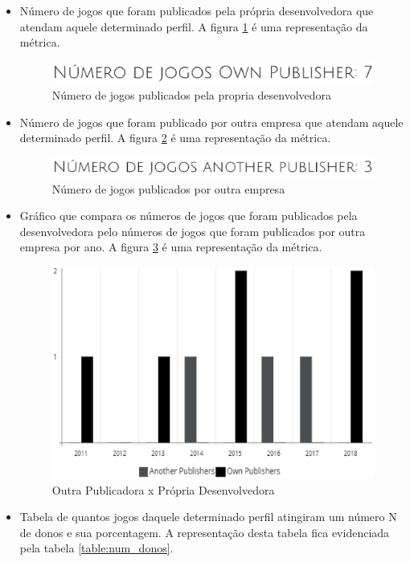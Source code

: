 \begin{itemize}
	\item Número de jogos que foram publicados pela própria desenvolvedora que atendam aquele determinado perfil. A figura \ref{image:own} é uma representação da métrica.
	\begin{figure}
	\centering
	\includegraphics[scale=0.5]{figuras/own_publisher.eps}
	\caption{Número de jogos publicados pela propria desenvolvedora}
	\label{image:own}
	\end{figure}
	\item Número de jogos que foram publicado por outra empresa que atendam aquele determinado perfil. A figura \ref{image:another} é uma representação da métrica.
	\begin{figure}
	\centering
	\includegraphics[scale=0.5]{figuras/another_publisher.eps}
	\caption{Número de jogos publicados por outra empresa}
	\label{image:another}
	\end{figure}
	\item Gráfico que compara os números de jogos que foram publicados pela desenvolvedora pelo números de jogos que foram publicados por outra empresa por ano. A figura \ref{image:anotherxown} é uma representação da métrica.
	\begin{figure}
	\centering
	\includegraphics[scale=0.4]{figuras/anotherxown.eps}
	\caption{Outra Publicadora x Própria Desenvolvedora}
	\label{image:anotherxown}
	\end{figure}
	\item Tabela de quantos jogos daquele determinado perfil atingiram um número N de donos e sua porcentagem. A representação desta tabela fica evidenciada pela tabela \ref{table:num_donos}.

\end{itemize}
